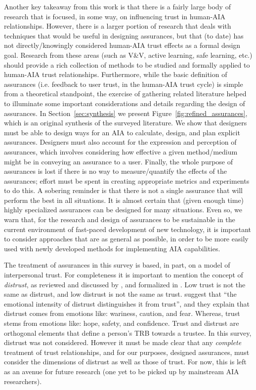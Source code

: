     Another key takeaway from this work is that there is a fairly large body of research that is focused, in some way, on influencing trust in human-AIA relationships. However, there is a larger portion of research that deals with techniques that would be useful in designing assurances, but that (to date) has not directly/knowingly considered human-AIA trust effects as a formal design goal. 
    Research from these areas (such as V\&V, active learning, safe learning, etc.) should provide a rich collection of methods to be studied and formally applied to human-AIA trust relationships.
Furthermore, while the basic definition of assurances (i.e. feedback to user trust, in the human-AIA trust cycle) is simple from a theoretical standpoint, the exercise of gathering related literature helped to illuminate some important considerations and details regarding the design of assurances. In Section~\ref{sec:synthesis} we present Figure~\ref{fig:refined_assurances}, which is an original synthesis of the surveyed literature. We show that designers must be able to design ways for an AIA to calculate, design, and plan explicit assurances. Designers must also account for the expression and perception of assurances, which involves considering how effective a given method/medium might be in conveying an assurance to a user. 
Finally, the whole purpose of assurances is lost if there is no way to measure/quantify the effects of the assurances; effort must be spent in creating appropriate metrics and experiments to do this. A sobering reminder is that there is not a single assurance that will perform the best in all situations. It is almost certain that (given enough time) highly specialized assurances can be designed for many situations. Even so, we warn that, for the research and design of assurances to be sustainable in the current environment of fast-paced development of new technology, it is important to consider approaches that are as general as possible, in order to be more easily used with newly developed methods for implementing AIA capabilities.

    The treatment of assurances in this survey is based, in part, on a model of interpersonal trust. For completeness it is important to mention the concept of \textit{distrust}, as reviewed and discussed by \citet{Lewicki1998-ox}, and formalized in \citet{McKnight2001-hm,McKnight2001-gz}. Low trust is not the same as distrust, and low distrust is not the same as trust. \citet{McKnight2001-gz} suggest that ``the emotional intensity of distrust distinguishes it from trust'', and they explain that distrust comes from emotions like: wariness, caution, and fear. Whereas, trust stems from emotions like: hope, safety, and confidence. Trust and distrust are orthogonal elements that define a person's TRB towards a trustee. In this survey, distrust was not considered. However it must be made clear that any \emph{complete} treatment of trust relationships, and for our purposes, designed assurances, must consider the dimensions of distrust as well as those of trust. For now, this is left as an avenue for future research (one yet to be picked up by mainstream AIA researchers).

